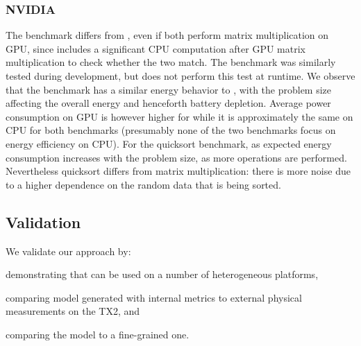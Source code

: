 \subsubsection*{\color{cyan}NVIDIA}

The  benchmark differs from , even if both perform matrix multiplication on GPU, since  includes a significant CPU computation after GPU matrix multiplication to check whether the two match. The  benchmark was similarly tested during development, but does not perform this test at runtime. We observe that the  benchmark has a similar energy behavior to , with the problem size affecting the overall energy and henceforth battery depletion. Average power consumption on GPU is however higher for  while it is approximately the same on CPU for both benchmarks (presumably none of the two benchmarks focus on energy efficiency on CPU). For the quicksort benchmark, as expected energy consumption increases with the problem size, as more operations are performed. Nevertheless quicksort differs from matrix multiplication: %
there is more noise due to a higher dependence on the random data that is being sorted. %

\subsection{\color{cyan}Validation}
\label{sec:experimental-results:validation}

We validate our approach by: 
\begin{enumerate*}[label={\alph*)},font={\bfseries}]
  \item demonstrating that \powprof{} can be used on a number of heterogeneous platforms,
  \item comparing model generated with internal metrics to external physical measurements on the TX2, and
  \item comparing the model to a fine-grained one.
\end{enumerate*}

